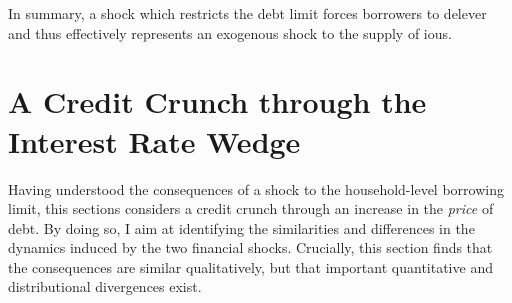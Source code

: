 \documentclass[12pt]{article} %
\numberwithin{equation}{section} %
\numberwithin{figure}{section}
\numberwithin{table}{section}
\begin{document}
In summary, a shock which restricts the debt limit forces borrowers to delever and thus effectively represents an exogenous shock to the supply of \Gls{iou}s. 









\section{A Credit Crunch through the Interest Rate Wedge}
\label{sec:wedge}

Having understood the consequences of a shock to the household-level borrowing limit, this sections considers a credit crunch through an increase in the \textit{price} of debt. By doing so, I aim at identifying the similarities and differences in the dynamics induced by the two financial shocks. Crucially, this section finds that the consequences are similar qualitatively, but that important quantitative and distributional divergences exist. 
\end{document}
